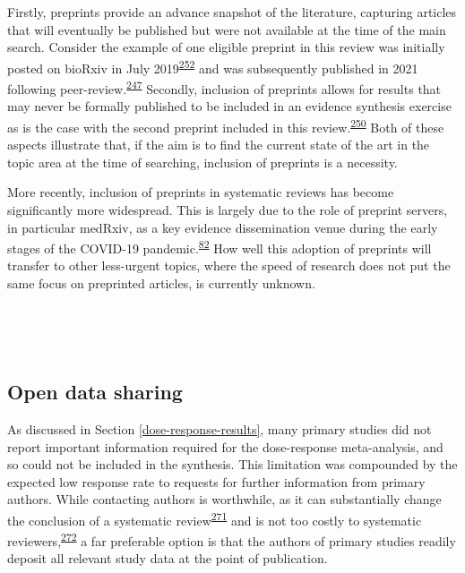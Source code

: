 \documentclass[a4paper, twoside]{templates/ociamthesis}
\begin{document}
Firstly, preprints provide an advance snapshot of the literature, capturing articles that will eventually be published but were not available at the time of the main search. Consider the example of one eligible preprint in this review was initially posted on bioRxiv in July 2019\textsuperscript{\protect\hyperlink{ref-andrews2019}{252}} and was subsequently published in 2021 following peer-review.\textsuperscript{\protect\hyperlink{ref-andrews2021}{247}} Secondly, inclusion of preprints allows for results that may never be formally published to be included in an evidence synthesis exercise as is the case with the second preprint included in this review.\textsuperscript{\protect\hyperlink{ref-so2017}{250}} Both of these aspects illustrate that, if the aim is to find the current state of the art in the topic area at the time of searching, inclusion of preprints is a necessity.

More recently, inclusion of preprints in systematic reviews has become significantly more widespread. This is largely due to the role of preprint servers, in particular medRxiv, as a key evidence dissemination venue during the early stages of the COVID-19 pandemic.\textsuperscript{\protect\hyperlink{ref-fraser2020preprinting}{82}} How well this adoption of preprints will transfer to other less-urgent topics, where the speed of research does not put the same focus on preprinted articles, is currently unknown.

~

~

\hypertarget{sys-rev-open-data}{%
\subsection{Open data sharing}\label{sys-rev-open-data}}

As discussed in Section \ref{dose-response-results}, many primary studies did not report important information required for the dose-response meta-analysis, and so could not be included in the synthesis. This limitation was compounded by the expected low response rate to requests for further information from primary authors. While contacting authors is worthwhile, as it can substantially change the conclusion of a systematic review\textsuperscript{\protect\hyperlink{ref-meursingereynders2019}{271}} and is not too costly to systematic reviewers,\textsuperscript{\protect\hyperlink{ref-cooper2019}{272}} a far preferable option is that the authors of primary studies readily deposit all relevant study data at the point of publication.
\end{document}
